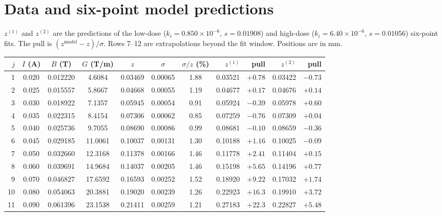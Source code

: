 \documentclass[11pt,a4paper]{article}
\newcommand{\kan}{k_i}
\begin{document}
\appendix
\section{Data and six-point model predictions}
\label{app:data}
$z^{(1)}$ and $z^{(2)}$ are the predictions of the low-dose ($\kan = 0.850\times10^{-6}$, $s = 0.01908$) and high-dose ($\kan = 6.40\times10^{-6}$, $s = 0.01056$) six-point fits. The pull is $(z^\text{model}-z)/\sigma$. Rows 7--12 are extrapolations beyond the fit window. Positions are in mm.

\begin{center}
\small
\setlength{\tabcolsep}{4pt}
\begin{tabular}{rcccccc rr rr}
\toprule
$j$ & $I$ (A) & $B$ (T) & $G$ (T/m) & $z$ & $\sigma$ & $\sigma/z$ (\%) & $z^{(1)}$ & pull & $z^{(2)}$ & pull\\
\midrule
 1 & 0.020 & 0.012220 & 4.6084 & 0.03469 & 0.00065 & 1.88 & 0.03521 & $+0.78$ & 0.03422 & $-0.73$ \\
 2 & 0.025 & 0.015557 & 5.8667 & 0.04668 & 0.00055 & 1.19 & 0.04677 & $+0.17$ & 0.04676 & $+0.14$ \\
 3 & 0.030 & 0.018922 & 7.1357 & 0.05945 & 0.00054 & 0.91 & 0.05924 & $-0.39$ & 0.05978 & $+0.60$ \\
 4 & 0.035 & 0.022315 & 8.4154 & 0.07306 & 0.00062 & 0.85 & 0.07259 & $-0.76$ & 0.07309 & $+0.04$ \\
 5 & 0.040 & 0.025736 & 9.7055 & 0.08690 & 0.00086 & 0.99 & 0.08681 & $-0.10$ & 0.08659 & $-0.36$ \\
 6 & 0.045 & 0.029185 & 11.0061 & 0.10037 & 0.00131 & 1.30 & 0.10188 & $+1.16$ & 0.10025 & $-0.09$ \\
\midrule
 7 & 0.050 & 0.032660 & 12.3168 & 0.11378 & 0.00166 & 1.46 & 0.11778 & $+2.41$ & 0.11404 & $+0.15$ \\
 8 & 0.060 & 0.039691 & 14.9684 & 0.14037 & 0.00205 & 1.46 & 0.15198 & $+5.65$ & 0.14196 & $+0.77$ \\
 9 & 0.070 & 0.046827 & 17.6592 & 0.16593 & 0.00252 & 1.52 & 0.18920 & $+9.22$ & 0.17032 & $+1.74$ \\
10 & 0.080 & 0.054063 & 20.3881 & 0.19020 & 0.00239 & 1.26 & 0.22923 & $+16.3$ & 0.19910 & $+3.72$ \\
11 & 0.090 & 0.061396 & 23.1538 & 0.21411 & 0.00259 & 1.21 & 0.27183 & $+22.3$ & 0.22827 & $+5.48$ \\

\end{tabular}
\end{center}
\end{document}
